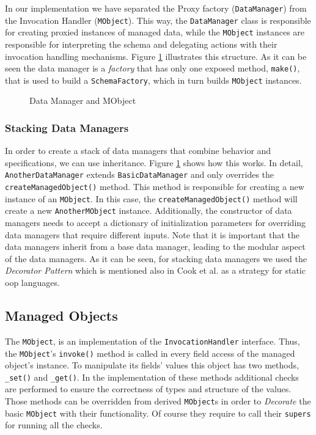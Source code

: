 In our implementation we have separated the Proxy factory (\texttt{DataManager}) from the Invocation Handler (\texttt{MObject}).
This way, the \texttt{DataManager} class is responsible for creating proxied instances of managed data, while the \texttt{MObject} instances are responsible for interpreting the schema and delegating actions with their invocation handling mechanisms. 
Figure \ref{fig:DataManager_and_MObject} illustrates this structure.
As it can be seen the data manager is a \textit{factory} that has only one exposed method, \texttt{make()}, that is used to build a \texttt{SchemaFactory}, which in turn builds \texttt{MObject} instances.

\begin{figure}[H]
	\centering
  	\caption{Data Manager and MObject}
  	\label{fig:DataManager_and_MObject}
\end{figure}

\subsubsection{Stacking Data Managers}
In order to create a stack of data managers that combine behavior and specifications, we can use inheritance.
Figure \ref{fig:DataManager_and_MObject} shows how this works.
In detail, \texttt{AnotherDataManager} extends \texttt{BasicDataManager} and only overrides the \texttt{createManagedObject()} method.
This method is responsible for creating a new instance of an \texttt{MObject}.
In this case, the \texttt{createManagedObject()} method will create a new \texttt{AnotherMObject} instance.
Additionally, the constructor of data managers needs to accept a dictionary of initialization parameters for overriding data managers that require different inputs.
Note that it is important that the data managers inherit from a base data manager, leading to the modular aspect of the data managers.
As it can be seen, for stacking data managers we used the \textit{Decorator Pattern} \cite{gamma1995design} which is mentioned also in Cook et al. \cite{loh2012managed} as a strategy for static \ac{oop} languages.

\subsection{Managed Objects}\label{sec:Managed Objects}
The \texttt{MObject}, is an implementation of the \texttt{InvocationHandler} interface.
Thus, the \texttt{MObject}'s \texttt{invoke()} method is called in every field access of the managed object's instance.
To manipulate its fields' values this object has two methods, \texttt{\_set()} and \texttt{\_get()}.
In the implementation of these methods additional checks are performed to ensure the correctness of types and structure of the values.
Those methods can be overridden from derived \texttt{MObject}s in order to \textit{Decorate} the basic \texttt{MObject} with their functionality. 
Of course they require to call their \texttt{supers} for running all the checks.


